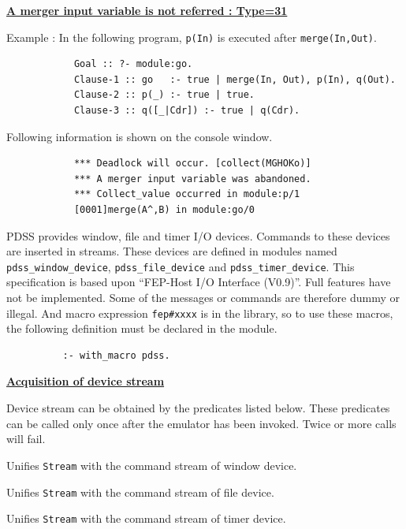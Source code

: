 \noindent\underline{\bf
A merger input variable is not referred : Type=31}
\vspace{1ex}\par
Example : In the following program, \verb|p(In)| is executed after \verb|merge(In,Out)|.
\begin{verbatim}
            Goal :: ?- module:go.
            Clause-1 :: go   :- true | merge(In, Out), p(In), q(Out).
            Clause-2 :: p(_) :- true | true.
            Clause-3 :: q([_|Cdr]) :- true | q(Cdr).
\end{verbatim}\par
Following information is shown on the console window.
\begin{verbatim}
            *** Deadlock will occur. [collect(MGHOKo)]
            *** A merger input variable was abandoned.
            *** Collect_value occurred in module:p/1
            [0001]merge(A^,B) in module:go/0
\end{verbatim}

\newpage
\BeginAppendix


PDSS provides window, file and timer I/O devices.
Commands to these devices are inserted in streams.
These devices are defined in modules named \verb|pdss_window_device|,
\verb|pdss_file_device| and \verb|pdss_timer_device|.  This specification is
based upon ``FEP-Host I/O Interface (V0.9)''.  Full features have
not be implemented. Some of the messages or commands are therefore 
dummy or illegal.
And macro expression \verb|fep#xxxx| is in the library, so to use these macros,
the following definition must be declared in the module.
\begin{verbatim}
          :- with_macro pdss.
\end{verbatim}
\vspace{1ex}

\noindent\underline{\bf Acquisition of device stream}\vspace{1ex}\par
{}
Device stream can be obtained by the predicates listed below.
These predicates can be called only once after the emulator has been
invoked.  Twice or more calls will fail.
\begin{itemize}

Unifies \verb|Stream| with the command stream of window device.

Unifies \verb|Stream| with the command stream of file device.

Unifies \verb|Stream| with the command stream of timer device.

\end{itemize}
\vspace{1ex}

